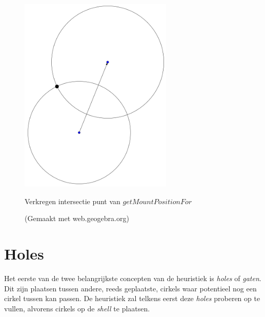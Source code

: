 \documentclass[12pt,a4paper,oneside]{book}
\begin{document}
\begin{figure}
  \centering
  \includegraphics[width=0.65\textwidth]{cirkel-cirkel-intersectie.png}
  \caption{Verkregen intersectie punt van $getMountPositionFor$} \label{fig:cirkel-cirkel-intersectie} 
  \caption*{(Gemaakt met web.geogebra.org)}
\end{figure}

\section{Holes} \label{sec:holes}

Het eerste van de twee belangrijkste concepten van de heuristiek is \textit{holes} of \textit{gaten}.
Dit zijn plaatsen tussen andere, reeds geplaatste, cirkels waar potentieel nog een cirkel tussen kan passen.
De heuristiek zal telkens eerst deze \textit{holes} proberen op te vullen, alvorens cirkels op de \textit{shell} te plaatsen.
\end{document}
